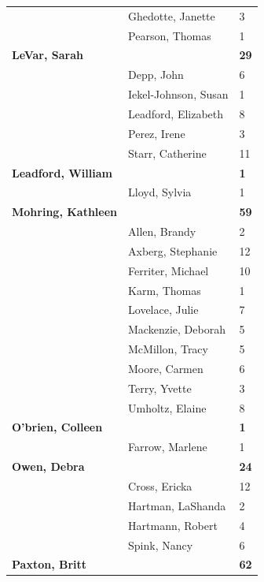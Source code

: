 \documentclass{article}\usepackage[]{graphicx}\usepackage[]{color}
\begin{document}
{\begin{longtable} { >{\raggedright}p{}|p{}p{}}
   & Ghedotte, Janette & 3 \\ 
   & Pearson, Thomas & 1 \\ 
   \rowcolor[gray]{0.90}\textbf{LeVar, Sarah} &  & \hspace{2cm}\textbf{29} \\ 
   \rowcolor[gray]{0.90} & Depp, John & 6 \\ 
   \rowcolor[gray]{0.90} & Iekel-Johnson, Susan & 1 \\ 
   & Leadford, Elizabeth & 8 \\ 
   & Perez, Irene & 3 \\ 
   & Starr, Catherine & 11 \\ 
   \rowcolor[gray]{0.90}\textbf{Leadford, William} &  & \hspace{2cm}\textbf{1} \\ 
   \rowcolor[gray]{0.90} & Lloyd, Sylvia & 1 \\ 
   \rowcolor[gray]{0.90}\textbf{Mohring, Kathleen} &  & \hspace{2cm}\textbf{59} \\ 
   & Allen, Brandy & 2 \\ 
   & Axberg, Stephanie & 12 \\ 
   & Ferriter, Michael & 10 \\ 
   \rowcolor[gray]{0.90} & Karm, Thomas & 1 \\ 
   \rowcolor[gray]{0.90} & Lovelace, Julie & 7 \\ 
   \rowcolor[gray]{0.90} & Mackenzie, Deborah & 5 \\ 
   & McMillon, Tracy & 5 \\ 
   & Moore, Carmen & 6 \\ 
   & Terry, Yvette & 3 \\ 
   \rowcolor[gray]{0.90} & Umholtz, Elaine & 8 \\ 
   \rowcolor[gray]{0.90}\textbf{O'brien, Colleen} &  & \hspace{2cm}\textbf{1} \\ 
   \rowcolor[gray]{0.90} & Farrow, Marlene & 1 \\ 
  \textbf{Owen, Debra} &  & \hspace{2cm}\textbf{24} \\ 
   & Cross, Ericka & 12 \\ 
   & Hartman, LaShanda & 2 \\ 
   \rowcolor[gray]{0.90} & Hartmann, Robert & 4 \\ 
   \rowcolor[gray]{0.90} & Spink, Nancy & 6 \\ 
   \rowcolor[gray]{0.90}\textbf{Paxton, Britt} &  & \hspace{2cm}\textbf{62} \\ 

\end{longtable}}
\end{document}
